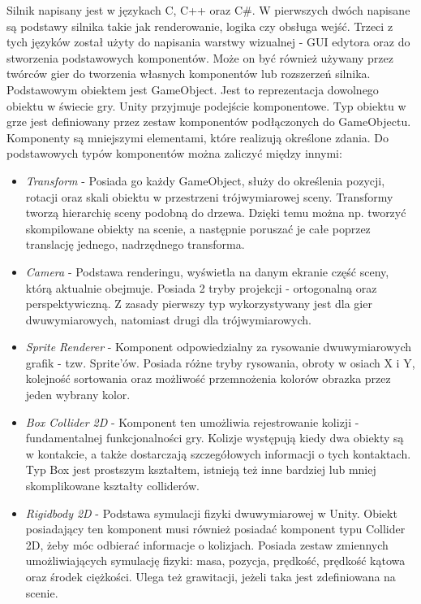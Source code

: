 \documentclass[a4paper,12pt,twoside,openany]{report}
\begin{document}
Silnik napisany jest w językach C, C++ oraz C\#. W pierwszych dwóch napisane są podstawy silnika takie jak renderowanie, logika czy obsługa wejść. Trzeci z tych języków został użyty do napisania warstwy wizualnej - GUI edytora oraz do stworzenia podstawowych komponentów. Może on być również używany przez twórców gier do tworzenia własnych komponentów lub rozszerzeń silnika.
Podstawowym obiektem jest GameObject. Jest to reprezentacja dowolnego obiektu w świecie gry. Unity przyjmuje podejście komponentowe. Typ obiektu w grze jest definiowany przez zestaw komponentów podłączonych do GameObjectu. Komponenty są mniejszymi elementami, które realizują określone zdania. Do podstawowych typów komponentów można zaliczyć między innymi:
\begin{itemize}
    \item \textit{Transform} - Posiada go każdy GameObject, służy do określenia pozycji, rotacji oraz skali obiektu w przestrzeni trójwymiarowej sceny. Transformy tworzą hierarchię sceny podobną do drzewa. Dzięki temu można np. tworzyć skompilowane obiekty na scenie, a następnie poruszać je całe poprzez translację jednego, nadrzędnego transforma.
    \item \textit{Camera} - Podstawa renderingu, wyświetla na danym ekranie część sceny, którą aktualnie obejmuje. Posiada 2 tryby projekcji - ortogonalną oraz perspektywiczną. Z zasady pierwszy typ wykorzystywany jest dla gier dwuwymiarowych, natomiast drugi dla trójwymiarowych.
    \item \textit{Sprite Renderer} - Komponent odpowiedzialny za rysowanie dwuwymiarowych grafik - tzw. Sprite'ów. Posiada różne tryby rysowania, obroty w osiach X i Y, kolejność sortowania oraz możliwość przemnożenia kolorów obrazka przez jeden wybrany kolor.
    \item \textit{Box Collider 2D} - Komponent ten umożliwia rejestrowanie kolizji - fundamentalnej funkcjonalności gry. Kolizje występują kiedy dwa obiekty są w kontakcie, a także dostarczają szczegółowych informacji o tych kontaktach. Typ Box jest prostszym kształtem, istnieją też inne bardziej lub mniej skomplikowane kształty colliderów.
    \item \textit{Rigidbody 2D} - Podstawa symulacji fizyki dwuwymiarowej w Unity. Obiekt posiadający ten komponent musi również posiadać komponent typu Collider 2D, żeby móc odbierać informacje o kolizjach. Posiada zestaw zmiennych umożliwiających symulację fizyki: masa, pozycja, prędkość, prędkość kątowa oraz środek ciężkości. Ulega też grawitacji, jeżeli taka jest zdefiniowana na scenie.

\end{itemize}
\end{document}
